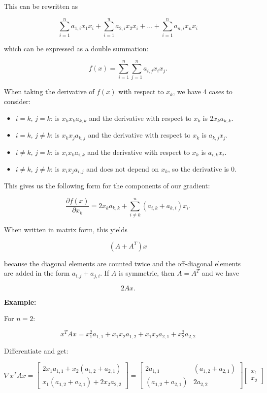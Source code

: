 This can be rewritten as

\[
    \sum_{i = 1}^{n} a_{1,i} x_1 x_i + \sum_{i = 1}^{n} a_{2,i} x_2 x_i + \dots + \sum_{i = 1}^{n} a_{n,i} x_n x_i
\]

which can be expressed as a double summation:

\[
    f(x) = \sum_{i = 1}^{n} \sum_{j = 1}^{n} a_{i,j} x_i x_j.
\]

When taking the derivative of \(f(x)\) with respect to \(x_k\), we have 4 cases to consider:

\begin{itemize}

    \item \(i = k,\, j = k\): is \(x_k x_k a_{k,k}\) and the derivative with respect to \(x_k\) is \(2x_k a_{k,k}\).

    \item \(i = k,\, j \neq k\): is \(x_k x_j a_{k,j}\) and the derivative with respect to \(x_k\) is \(a_{k,j} x_j\).

    \item \(i \neq k,\, j = k\): is \(x_i x_k a_{i,k}\) and the derivative with respect to \(x_k\) is \(a_{i,k} x_i\).

    \item \(i \neq k,\, j \neq k\): is \(x_i x_j a_{i,j}\) and does not depend on \(x_k\), so the derivative is 0.

\end{itemize}

This gives us the following form for the components of our gradient: 

\[
    \frac{\partial f(x)}{\partial x_k} = 2x_k a_{k,k} + \sum_{i \neq k}^{n} (a_{i,k} + a_{k, i}) x_i.
\]

When written in matrix form, this yields

\[
    (A + A^T)x
\]

because the diagonal elements are counted twice and the off-diagonal elements are added in the form \( a_{i,j} + a_{j,i} \).
If \(A\) is symmetric, then \(A = A^T\) and we have

\[
    2Ax.
\]

\QED

\textbf{Example:}

For \(n  = 2 \): 

\[
    x^T A x =   x_1^2 a_{1, 1} + x_1 x_2 a_{1, 2} + x_1 x_2 a_{2,1} + x_2^2 a_{2,2} 
\]

Differentiate and get: 

\[
    \nabla x^T A x = 
    \begin{bmatrix}
        2x_1 a_{1, 1} + x_2 (a_{1,2} + a_{2,1}) \\ 
        x_1 (a_{1,2} + a_{2,1}) + 2x_2 a_{2,2}
    \end{bmatrix}
    = 
    \begin{bmatrix}
        2a_{1, 1}  & (a_{1,2} + a_{2,1}) \\ 
        (a_{1,2} + a_{2,1}) & 2 a_{2,2}
    \end{bmatrix}
    \begin{bmatrix}
        x_1 \\ 
        x_2
    \end{bmatrix}
\]